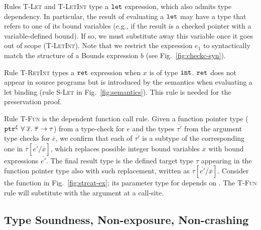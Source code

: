 %
Rules \textsc{T-Let} and \textsc{T-LetInt} type a $\mathtt{let}$ expression, which also admits
type dependency. 
In particular, the result of evaluating a $\mathtt{let}$
may have a type that refers to one of its bound variables (e.g., if
the result is a checked pointer with a variable-defined bound). If so, we must substitute away this variable once it goes out of scope (\textsc{T-LetInt}). 
Note that we restrict the expression $e_1$ to syntactically match the
structure of a Bounds expression $b$ (see Fig.~\ref{fig:checkc-syn}).

Rule \textsc{T-RetInt} types a $\mathtt{ret}$ expression when $x$ is of type $\mathtt{int}$.
$\mathtt{ret}$ does not appear in source programs but is introduced by the semantics when
evaluating a let binding (rule \textsc{S-Let} in
Fig.~\ref{fig:semantics}). This rule is needed for the preservation
proof.

Rule \textsc{T-Fun} is the dependent function call rule. 
Given a function pointer type ($\mathtt{ptr}^{\xi}~{\forall \;\overline{x}.\;{\overline{\tau}}\to\tau}$)
from a type-check for $e$ and the types $\overline{\tau'}$ from the argument type checks for $\overline{e}$,
we confirm that each of $\overline{\tau'}$ is
a subtype of the corresponding one in $\overline{\tau}[\overline{e'} / \overline{x}]$,
which replaces possible integer bound variables $\overline{x}$ with bound expressions $\overline{e'}$.
The final result type is the defined target type $\tau$ appearing in the function pointer type
also with such replacement, written as $\tau[\overline{e'} / \overline{x}]$.
Consider the  function in
Fig.~\ref{fig:strcat-ex}; its parameter type for  
depends on . The \textsc{T-Fun} rule will substitute 
 with the argument at a call-site.

\subsection{Type Soundness, Non-exposure, Non-crashing}\label{sec:theorem}

